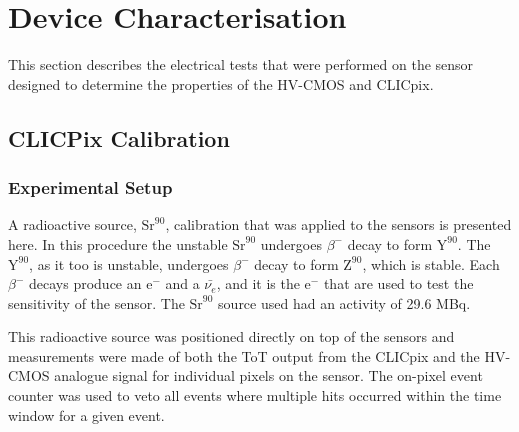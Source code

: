 \section{Device Characterisation}

This section describes the electrical tests that were performed on the sensor designed to determine the properties of the HV-CMOS and CLICpix.  

\subsection{CLICPix Calibration}

\subsubsection{Experimental Setup}
A radioactive source, $\text{Sr}^{90}$, calibration that was applied to the sensors is presented here.  In this procedure the unstable $\text{Sr}^{90}$ undergoes $\beta^{-}$ decay to form $\text{Y}^{90}$.  The $\text{Y}^{90}$, as it too is unstable, undergoes $\beta^{-}$ decay to form $\text{Z}^{90}$, which is stable.  Each $\beta^{-}$ decays produce an $\text{e}^{-}$ and a $\bar{\nu_{e}}$, and it is the $\text{e}^{-}$ that are used to test the sensitivity of the sensor.  The $\text{Sr}^{90}$ source used had an activity of 29.6 MBq.  

This radioactive source was positioned directly on top of the sensors and measurements were made of both the ToT output from the CLICpix and the HV-CMOS analogue signal for individual pixels on the sensor.  The on-pixel event counter was used to veto all events where multiple hits occurred within the time window for a given event.  

